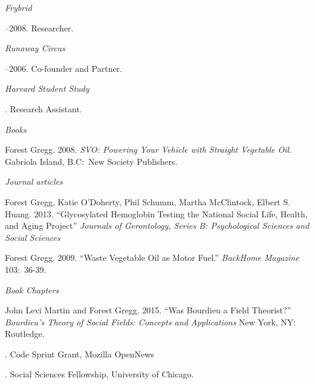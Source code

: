 \documentclass[11pt]{article}
\begin{document}
\noindent\emph{Frybrid \vspace{0.01in}}

--2008. Researcher.

\medskip

\noindent\emph{Runaway Circus \vspace{0.01in}}

--2006. Co-founder and Partner. 
\medskip

\noindent\emph{Harvard Student Study \vspace{0.01in}}

. Research Assistant.



\medskip
\noindent\emph{Books \vspace{0.01in}}

\ind  Forest Gregg. 2008. \emph{SVO: Powering Your Vehicle with Straight Vegetable Oil}. Gabriola Island, B.C:~New Society Publishers.\vspace{-.075in}

\normalsize

\bigskip
\noindent\emph{Journal articles \vspace{0.05in}}

\ind Forest Gregg, Katie O'Doherty, Phil Schumm, Martha McClintock, Elbert S. Huang. 2013. ``Glycosylated Hemoglobin Testing the National Social Life, Health, and Aging Project'' \emph{Journals of Gerontology, Series B: Psychological Sciences and Social Sciences}

\ind Forest Gregg. 2009. ``Waste Vegetable Oil as Motor Fuel.'' \emph{BackHome Magazine} 103:~36-39.

\normalsize

\bigskip
\noindent\emph{Book Chapters \vspace{0.05in}}


\ind John Levi Martin and Forest Gregg. 2015. ``Was Bourdieu a Field
Theorist?'' \emph{Bourdieu's Theory of Social Fields: Concepts and
  Applications} New York, NY: Routledge.

\medskip

. Code Sprint Grant, Mozilla OpenNews
 
. Social Sciences Fellowship, University of Chicago.



\bigskip
\end{document}

